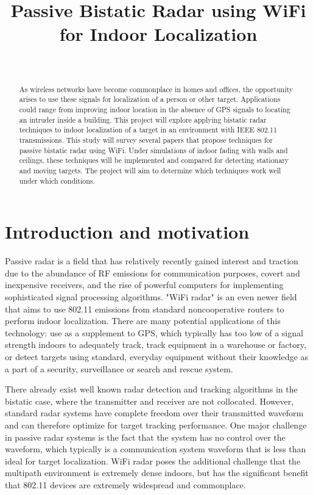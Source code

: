 \documentclass[article,11pt,onecolumn,final]{IEEEtran}
\title{Passive Bistatic Radar using WiFi for Indoor Localization}
\author{\IEEEauthorblockN{Alexander and Ernest (TODO last names)}  \\
\IEEEauthorblockA{Department of Electrical and Computer Engineering\\ 
Boston University
}}
\begin{document}
\maketitle
\begin{abstract}
As wireless networks have become commonplace in homes and offices, the opportunity arises to use
these signals for localization of a person or other target. Applications could range from improving indoor
location in the absence of GPS signals to locating an intruder inside a building. This project will explore
applying bistatic radar techniques to indoor localization of a target in an environment with IEEE 802.11
transmissions. This study will survey several papers that propose techniques for passive bistatic radar
using WiFi. Under simulations of indoor fading with walls and ceilings, these techniques will be
implemented and compared for detecting stationary and moving targets. The project will aim to
determine which techniques work well under which conditions.
\end{abstract}

\section{Introduction and motivation} 
Passive radar is a field that has relatively recently gained interest and traction due to the abundance of
RF emissions for communication purposes, covert and inexpensive receivers, and the rise of powerful
computers for implementing sophisticated signal processing algorithms. "WiFi radar" is an even newer
field that aims to use 802.11 emissions from standard noncooperative routers to perform indoor
localization. There are many potential applications of this technology: use as a supplement to GPS,
which typically has too low of a signal strength indoors to adequately track, track equipment in a
warehouse or factory, or detect targets using standard, everyday equipment without their knowledge as
a part of a security, surveillance or search and rescue system.

There already exist well known radar detection and tracking algorithms in the bistatic case, where the
transmitter and receiver are not collocated. However, standard radar systems have complete freedom
over their transmitted waveform and can therefore optimize for target tracking performance. One major
challenge in passive radar systems is the fact that the system has no control over the waveform, which
typically is a communication system waveform that is less than ideal for target localization. WiFi radar
poses the additional challenge that the multipath environment is extremely dense indoors, but has the
significant benefit that 802.11 devices are extremely widespread and commonplace.
\end{document}

